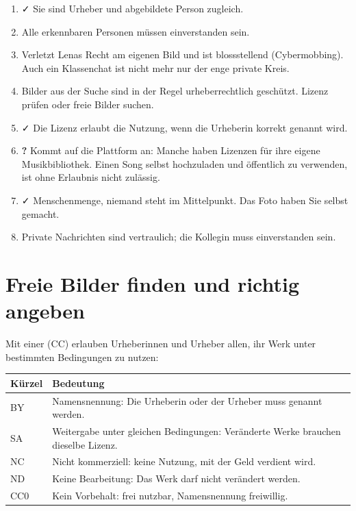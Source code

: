 \begin{myexercise}
	\begin{myanswer}
		\begin{enumerate}
			\item \faCheck{} Sie sind Urheber und abgebildete Person zugleich.
			\item \faTimes{} Alle erkennbaren Personen müssen einverstanden sein.
			\item \faTimes{} Verletzt Lenas Recht am eigenen Bild und ist blossstellend (Cybermobbing). Auch ein Klassenchat ist nicht mehr nur der enge private Kreis.
			\item \faTimes{} Bilder aus der Suche sind in der Regel urheberrechtlich geschützt. Lizenz prüfen oder freie Bilder suchen.
			\item \faCheck{} Die Lizenz erlaubt die Nutzung, wenn die Urheberin korrekt genannt wird.
			\item \textbf{?} Kommt auf die Plattform an: Manche haben Lizenzen für ihre eigene Musikbibliothek. Einen Song selbst hochzuladen und öffentlich zu verwenden, ist ohne Erlaubnis nicht zulässig.
			\item \faCheck{} Menschenmenge, niemand steht im Mittelpunkt. Das Foto haben Sie selbst gemacht.
			\item \faTimes{} Private Nachrichten sind vertraulich; die Kollegin muss einverstanden sein.
		\end{enumerate}
	\end{myanswer}
\end{myexercise}

\section{Freie Bilder finden und richtig angeben}

Mit einer  (\gls{CC}) erlauben Urheberinnen und Urheber allen, ihr Werk unter bestimmten Bedingungen zu nutzen:

\begin{center}
	\renewcommand{\arraystretch}{1.3}
	\begin{tabular}{lp{11cm}}
		\textbf{Kürzel} & \textbf{Bedeutung}                                                                 \\
		\midrule
		BY              & Namensnennung: Die Urheberin oder der Urheber muss genannt werden.                 \\
		SA              & Weitergabe unter gleichen Bedingungen: Veränderte Werke brauchen dieselbe Lizenz.  \\
		NC              & Nicht kommerziell: keine Nutzung, mit der Geld verdient wird.                      \\
		ND              & Keine Bearbeitung: Das Werk darf nicht verändert werden.                           \\
		CC0             & Kein Vorbehalt: frei nutzbar, Namensnennung freiwillig.                            \\
	\end{tabular}
\end{center}


